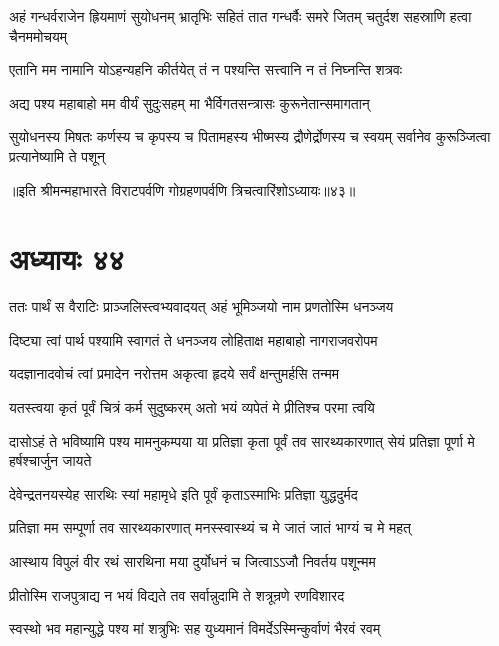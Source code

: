 \threelineshloka
{अहं गन्धर्वराजेन ह्रियमाणं सुयोधनम्}
{भ्रातृभिः सहितं तात गन्धर्वैः समरे जितम्}
{चतुर्दश सहस्राणि हत्वा चैनममोचयम्}


\twolineshloka
{एतानि मम नामानि योऽहन्यहनि कीर्तयेत्}
{तं न पश्यन्ति सत्त्वानि न तं निघ्नन्ति शत्रवः}


\twolineshloka
{अद्य पश्य महाबाहो मम वीर्यं सुदुःसहम्}
{मा भैर्विगतसन्त्रासः कुरूनेतान्समागतान्}


\threelineshloka
{सुयोधनस्य मिषतः कर्णस्य च कृपस्य च}
{पितामहस्य भीष्मस्य द्रौणेर्द्रोणस्य च स्वयम्}
{सर्वानेव कुरूञ्जित्वा प्रत्यानेष्यामि ते पशून्}

॥इति श्रीमन्महाभारते विराटपर्वणि गोग्रहणपर्वणि त्रिचत्वारिंशोऽध्यायः॥४३॥

\chapter{अध्यायः ४४}

\twolineshloka
{ततः पार्थं स वैराटिः प्राञ्जलिस्त्वभ्यवादयत्}
{अहं भूमिञ्जयो नाम प्रणतोस्मि धनञ्जय}


\twolineshloka
{दिष्ट्या त्वां पार्थ पश्यामि स्वागतं ते धनञ्जय}
{लोहिताक्ष महाबाहो नागराजवरोपम}


\twolineshloka
{यदज्ञानादवोचं त्वां प्रमादेन नरोत्तम}
{अकृत्वा हृदये सर्वं क्षन्तुमर्हसि तन्मम}


\twolineshloka
{यतस्त्वया कृतं पूर्वं चित्रं कर्म सुदुष्करम्}
{अतो भयं व्यपेतं मे प्रीतिश्च परमा त्वयि}


\onelineshloka
{दासोऽहं ते भविष्यामि पश्य मामनुकम्पया}
\twolineshloka
{या प्रतिज्ञा कृता पूर्वं तव सारथ्यकारणात्}
{सेयं प्रतिज्ञा पूर्णा मे हर्षश्चार्जुन जायते}


\twolineshloka
{देवेन्द्रतनयस्येह सारथिः स्यां महामृधे}
{इति पूर्वं कृताऽस्माभिः प्रतिज्ञा युद्धदुर्मद}


\twolineshloka
{प्रतिज्ञा मम सम्पूर्णा तव सारथ्यकारणात्}
{मनस्स्वास्थ्यं च मे जातं जातं भाग्यं च मे महत्}


\twolineshloka
{आस्थाय विपुलं वीर रथं सारथिना मया}
{दुर्योधनं च जित्वाऽऽजौ निवर्तय पशून्मम}




\twolineshloka
{प्रीतोस्मि राजपुत्राद्य न भयं विद्यते तव}
{सर्वान्नुदामि ते शत्रून्रणे रणविशारद}


\twolineshloka
{स्वस्थो भव महान्युद्धे पश्य मां शत्रुभिः सह}
{युध्यमानं विमर्देऽस्मिन्कुर्वाणं भैरवं रवम्}



